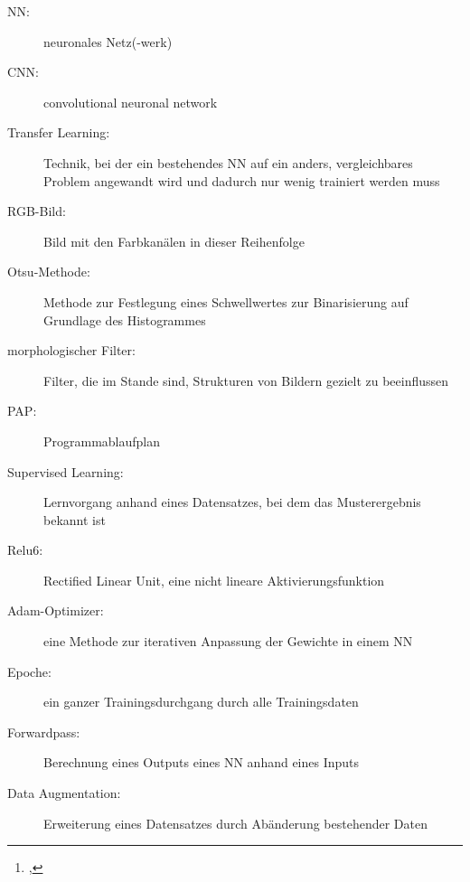\documentclass[12pt,toc=bib,toc=listof]{scrreprt}
\title{\reprttopic}
\author{\reprtstudentname\footnote{\reprtstudentid, \reprtstudentmail}}
\begin{document}
\renewcommand*{\figurename}{Abb.}
\maketitle
{}

\tableofcontents

\label{sec:abkuerzungsverzeichnis}

\begin{description}
  \item[NN:] neuronales Netz(-werk)
  \item[CNN:] convolutional neuronal network
  \item[Transfer Learning:] Technik, bei der ein bestehendes NN auf ein anders, vergleichbares Problem angewandt wird und dadurch nur wenig trainiert werden muss  
  \item[RGB-Bild:] Bild mit den Farbkanälen in dieser Reihenfolge
  \item[Otsu-Methode:] Methode zur Festlegung eines Schwellwertes zur Binarisierung auf Grundlage des Histogrammes
  \item[morphologischer Filter:] Filter, die im Stande sind, Strukturen von Bildern gezielt zu beeinflussen \cite{digi_bv}
  \item[PAP: ] Programmablaufplan
  \item[Supervised Learning: ] Lernvorgang anhand eines Datensatzes, bei dem das Musterergebnis bekannt ist
  \item[Relu6: ] Rectified Linear Unit, eine nicht lineare Aktivierungsfunktion 
  \item[Adam-Optimizer:] eine Methode zur iterativen Anpassung der Gewichte in einem NN
  \item[Epoche:] ein ganzer Trainingsdurchgang durch alle Trainingsdaten 
  \item[Forwardpass:] Berechnung eines Outputs eines NN anhand eines Inputs
  \item[Data Augmentation:] Erweiterung eines Datensatzes durch Abänderung bestehender Daten
   
\end{description}


\onehalfspacing


\newpage
{}
\end{document}
